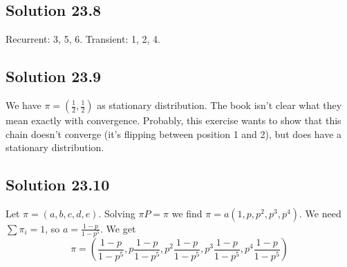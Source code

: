 \subsection*{Solution 23.8}

Recurrent: 3, 5, 6.
Transient: 1, 2, 4.


\subsection*{Solution 23.9}

We have $\pi = (\frac{1}{2}, \frac{1}{2})$ as stationary distribution.
The book isn't clear what they mean exactly with convergence.
Probably, this exercise wants to show that this chain doesn't converge (it's flipping between position 1 and 2), but does have a stationary distribution.


\subsection*{Solution 23.10}

Let $\pi = (a, b, c, d, e)$.
Solving $\pi P = \pi$ we find $\pi = a (1, p, p^2, p^3, p^4)$.
We need $\sum \pi_i = 1$, so $a = \frac{1 - p}{1 - p^5}$.
We get
\begin{equation*}
    \pi = \left(
        \frac{1 - p}{1 - p^5},
        p \frac{1 - p}{1 - p^5},
        p^2 \frac{1 - p}{1 - p^5},
        p^3 \frac{1 - p}{1 - p^5},
        p^4 \frac{1 - p}{1 - p^5}
    \right)
\end{equation*}
